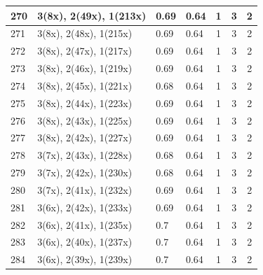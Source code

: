 \begin{small}
\begin{longtable}{|p{0.5cm}|p{9cm}|p{1.3cm}|p{1.3cm}|c|c|c|}
  270 & 3(8x), 2(49x), 1(213x) & \cellcolor{colorBad}  0.69 & \cellcolor{colorBad} 0.64 & 1 & 3 & \cellcolor{colorGood} 2 \\   \hline
  271 & 3(8x), 2(48x), 1(215x) & \cellcolor{colorBad}  0.69 & \cellcolor{colorBad} 0.64 & 1 & 3 & \cellcolor{colorGood} 2 \\   \hline
  272 & 3(8x), 2(47x), 1(217x) & \cellcolor{colorBad}  0.69 & \cellcolor{colorBad} 0.64 & 1 & 3 & \cellcolor{colorGood} 2 \\   \hline
  273 & 3(8x), 2(46x), 1(219x) & \cellcolor{colorBad}  0.69 & \cellcolor{colorBad} 0.64 & 1 & 3 & \cellcolor{colorGood} 2 \\   \hline
  274 & 3(8x), 2(45x), 1(221x) & \cellcolor{colorBad}  0.68 & \cellcolor{colorBad} 0.64 & 1 & 3 & \cellcolor{colorGood} 2 \\   \hline
  275 & 3(8x), 2(44x), 1(223x) & \cellcolor{colorBad}  0.69 & \cellcolor{colorBad} 0.64 & 1 & 3 & \cellcolor{colorGood} 2 \\   \hline
  276 & 3(8x), 2(43x), 1(225x) & \cellcolor{colorBad}  0.69 & \cellcolor{colorBad} 0.64 & 1 & 3 & \cellcolor{colorGood} 2 \\   \hline
  277 & 3(8x), 2(42x), 1(227x) & \cellcolor{colorBad}  0.69 & \cellcolor{colorBad} 0.64 & 1 & 3 & \cellcolor{colorGood} 2 \\   \hline
  278 & 3(7x), 2(43x), 1(228x) & \cellcolor{colorBad}  0.68 & \cellcolor{colorBad} 0.64 & 1 & 3 & \cellcolor{colorGood} 2 \\   \hline
  279 & 3(7x), 2(42x), 1(230x) & \cellcolor{colorBad}  0.68 & \cellcolor{colorBad} 0.64 & 1 & 3 & \cellcolor{colorGood} 2 \\   \hline
  280 & 3(7x), 2(41x), 1(232x) & \cellcolor{colorBad}  0.69 & \cellcolor{colorBad} 0.64 & 1 & 3 & \cellcolor{colorGood} 2 \\   \hline
  281 & 3(6x), 2(42x), 1(233x) & \cellcolor{colorBad}  0.69 & \cellcolor{colorBad} 0.64 & 1 & 3 & \cellcolor{colorGood} 2 \\   \hline
  282 & 3(6x), 2(41x), 1(235x) & \cellcolor{colorBad}  0.7 & \cellcolor{colorBad} 0.64 & 1 & 3 & \cellcolor{colorGood} 2 \\   \hline
  283 & 3(6x), 2(40x), 1(237x) & \cellcolor{colorBad}  0.7 & \cellcolor{colorBad} 0.64 & 1 & 3 & \cellcolor{colorGood} 2 \\   \hline
  284 & 3(6x), 2(39x), 1(239x) & \cellcolor{colorBad}  0.7 & \cellcolor{colorBad} 0.64 & 1 & 3 & \cellcolor{colorGood} 2 \\   \hline

\end{longtable}
\end{small}
